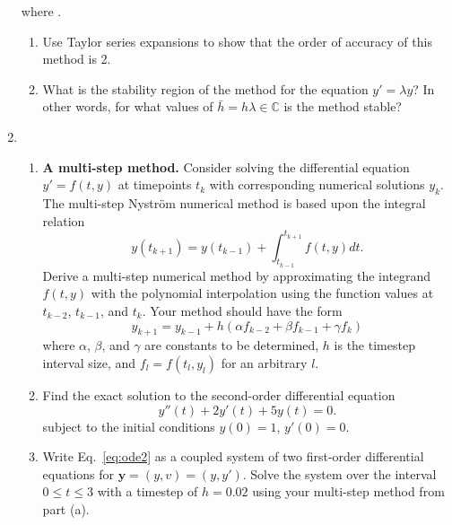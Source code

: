 \documentclass[11pt]{article}
\newcommand{\C}{\mathbb{C}}
\renewcommand{\vec}[1]{\mathbf{#1}}
\begin{document}
\begin{enumerate}
\begin{equation}
    \end{equation}
    where .
    \begin{enumerate}
      \item Use Taylor series expansions to show that the order of accuracy of
	this method is 2.
      \item What is the stability region of the method for the equation $y' =
	\lambda y$? In other words, for what values of $\bar{h} = h\lambda \in
	\C$ is the method stable?
    \end{enumerate}
  \item 
    \begin{enumerate}
      \item \textbf{A multi-step method.} Consider solving the differential
	equation $y'=f(t,y)$ at timepoints $t_k$ with corresponding numerical
	solutions $y_k$. The multi-step Nystr\"om numerical method is based
	upon the integral relation
	\begin{equation}
	  y(t_{k+1}) = y(t_{k-1}) + \int_{t_{k-1}}^{t_{k+1}} f(t,y) dt.
	\end{equation}
	Derive a multi-step numerical method by approximating the integrand
	$f(t,y)$ with the polynomial interpolation using the function
	values at $t_{k-2}$, $t_{k-1}$, and $t_k$. Your method should have the
	form
	\begin{equation}
	  y_{k+1} = y_{k-1} + h(\alpha f_{k-2}+\beta f_{k-1} + \gamma f_k) \label{eq:nys}
	\end{equation}
	where $\alpha$, $\beta$, and $\gamma$ are constants to be determined,
	$h$ is the timestep interval size, and $f_l=f(t_l,y_l)$ for an arbitrary
	$l$.
      \item Find the exact solution to the second-order differential equation
	\begin{equation}
	  y''(t)+2y'(t) + 5y(t)=0. \label{eq:ode2}
	\end{equation}
	subject to the initial conditions $y(0)=1$, $y'(0)=0$.
      \item Write Eq.~\ref{eq:ode2} as a coupled system of two first-order
	differential equations for $\vec{y}=(y,v)=(y,y')$. Solve the system
	over the interval $0\le t\le 3$ with a timestep of $h=0.02$ using your
	multi-step method from part (a).


\end{enumerate}
\end{enumerate}
\end{document}
